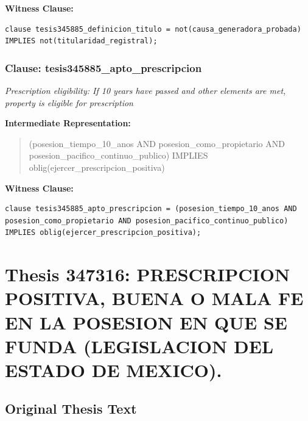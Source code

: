 \documentclass[11pt,a4paper]{article}
\begin{document}
\textbf{Witness Clause:}

\begin{lstlisting}[style=witnessstyle, language=Witness]
clause tesis345885_definicion_titulo = not(causa_generadora_probada) IMPLIES not(titularidad_registral);
\end{lstlisting}

\subsubsection{Clause: tesis345885\_apto\_prescripcion}

\textit{Prescription eligibility: If 10 years have passed and other elements are met, property is eligible for prescription}

\textbf{Intermediate Representation:}

\begin{quote}
(posesion\_tiempo\_10\_anos AND posesion\_como\_propietario AND posesion\_pacifico\_continuo\_publico) IMPLIES oblig(ejercer\_prescripcion\_positiva)
\end{quote}

\textbf{Witness Clause:}

\begin{lstlisting}[style=witnessstyle, language=Witness]
clause tesis345885_apto_prescripcion = (posesion_tiempo_10_anos AND posesion_como_propietario AND posesion_pacifico_continuo_publico) IMPLIES oblig(ejercer_prescripcion_positiva);
\end{lstlisting}

\newpage

\section{Thesis 347316: PRESCRIPCION POSITIVA, BUENA O MALA FE EN LA POSESION EN QUE SE FUNDA (LEGISLACION DEL ESTADO DE MEXICO).}
\label{thesis:347316}

\subsection{Original Thesis Text}
\end{document}

